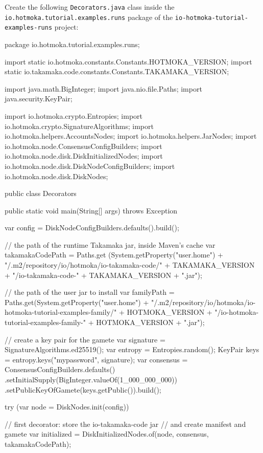 Create the following \texttt{Decorators.java} class inside the
\texttt{io.hotmoka.tutorial.examples.runs} package of the
\texttt{io-hotmoka-tutorial-examples-runs} project:
%
\begin{codebox}\begin{javalst}
package io.hotmoka.tutorial.examples.runs;

import static io.hotmoka.constants.Constants.HOTMOKA_VERSION;
import static io.takamaka.code.constants.Constants.TAKAMAKA_VERSION;

import java.math.BigInteger;
import java.nio.file.Paths;
import java.security.KeyPair;

import io.hotmoka.crypto.Entropies;
import io.hotmoka.crypto.SignatureAlgorithms;
import io.hotmoka.helpers.AccountsNodes;
import io.hotmoka.helpers.JarNodes;
import io.hotmoka.node.ConsensusConfigBuilders;
import io.hotmoka.node.disk.DiskInitializedNodes;
import io.hotmoka.node.disk.DiskNodeConfigBuilders;
import io.hotmoka.node.disk.DiskNodes;

public class Decorators {
 
  public static void main(String[] args) throws Exception {
    var config = DiskNodeConfigBuilders.defaults().build();

    // the path of the runtime Takamaka jar, inside Maven's cache
    var takamakaCodePath = Paths.get
      (System.getProperty("user.home")
      + "/.m2/repository/io/hotmoka/io-takamaka-code/" + TAKAMAKA_VERSION
      + "/io-takamaka-code-" + TAKAMAKA_VERSION + ".jar");

    // the path of the user jar to install
    var familyPath = Paths.get(System.getProperty("user.home")
      + "/.m2/repository/io/hotmoka/io-hotmoka-tutorial-examples-family/"
      + HOTMOKA_VERSION
      + "/io-hotmoka-tutorial-examples-family-" + HOTMOKA_VERSION + ".jar");

    // create a key pair for the gamete
    var signature = SignatureAlgorithms.ed25519();
    var entropy = Entropies.random();
    KeyPair keys = entropy.keys("mypassword", signature);
    var consensus = ConsensusConfigBuilders.defaults()
   	  .setInitialSupply(BigInteger.valueOf(1_000_000_000))
   	  .setPublicKeyOfGamete(keys.getPublic()).build();

	 try (var node = DiskNodes.init(config)) {
      // first decorator: store the io-takamaka-code jar
      // and create manifest and gamete
      var initialized = DiskInitializedNodes.of(node, consensus, takamakaCodePath);

}}}
\end{javalst}
\end{codebox}
